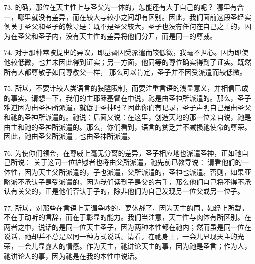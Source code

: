 73. 的确，那位在天主性上与圣父为一体的，怎能还有大于自己的呢？ 哪里有合一，哪里就没有差异，而在较大与较小之间却有区别。因此，我们面前这段圣经实例关于圣父和圣子的教导是：既不是圣父较大，圣子也没有任何在自己之上的，因为在圣父和圣子内，没有天主性的差异将他们分开，而是同一的尊威。\par

\par

74. 对于那种常被提出的异议，即基督因受派遣而较低微，我毫不担心。因为即使他较低微，也并未因此得到证实；另一方面，他同等的尊位确实得到了证实。既然所有人都尊敬子如同尊敬父一样， 那么可以肯定，圣子并不因受派遣而较低微。\par

75. 所以，不要计较人类语言的狭隘限制，而要注重言语的浅显意义，并相信已成的事实。请想一下，我们的主耶稣基督在中说，祂是由圣神所派遣的。那么，圣子难道因为由圣神所派遣，就低于圣神吗？因此你们有记录，圣子声明自己是由圣父和祂的圣神所派遣的。祂说：后面又说：在这里，创造天地的那一位亲自说，祂是由主和祂的圣神所派遣的。那么，你们看到，语言的贫乏并不减损祂使命的尊荣。因此，祂由圣父所派遣；也由圣神所派遣。\par

76. 为使你们领会，在尊威上毫无分离的差异，圣子相应地也派遣圣神，正如祂自己所说： 关于这同一位护慰者也将由父所派遣，祂先前已教导说： 请看他们的一体性，因为天主父所派遣的，子也派遣，父所派遣的，圣神也派遣。否则，如果亚略派不承认子是受派遣的，因为我们读到子是父的右手，那么他们自己将不得不承认有关父的，正是他们否认于子的，除非他们为自己发现另一位父或另一位子。\par

77. 所以，对那些在言语上无谓争吵的，要休战了，因为天主的国，如经上所载，不在于动听的言辞，而在于彰显的能力。我们当注意，天主性与肉体有所区别。在两者之中，说话的是同一位天主圣子，因为两种本性都在祂内；然而虽是同一位在说话，祂却并不总是以同一种方式说话。请看，在祂身上，一会儿显现天主的光荣，一会儿显露人的情感。作为天主，祂讲论天主的事，因为祂是圣言；作为人，祂讲论人的事，因为祂是在我的本性中说话。\par

